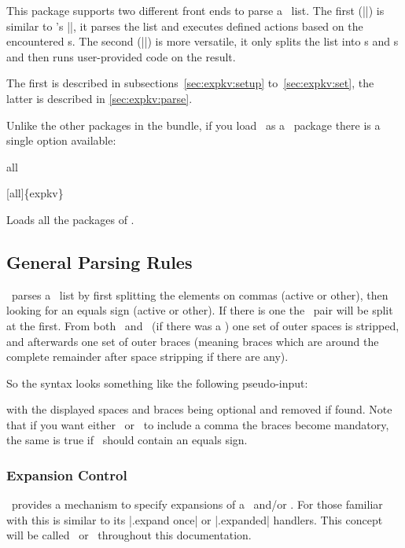 \genericekv\expkv{}

This package supports two different front ends to parse a \kv\ list. The first
(|\ekvset|) is similar to 's |\setkeys|, it parses the list and
executes defined actions based on the encountered \key{}s. The second
(|\ekvparse|) is more versatile, it only splits the list into \key{}s and
\val{}s and then runs user-provided code on the result.

The first is described in subsections~\ref{sec:expkv:setup}
to~\ref{sec:expkv:set}, the latter is described in \autoref{sec:expkv:parse}.

Unlike the other packages in the bundle, if you load \expkv\ as a \LaTeXe\
package there is a single option available:
\begin{function}{all}
  \begin{syntax}
    [all]\{expkv\}
  \end{syntax}
  Loads all the packages of \expkvbundle.
\end{function}

\subsection{General Parsing Rules}

\expkv\ parses a \kv\ list by first splitting the elements on commas (active or
other), then looking for an equals sign (active or other). If there is one the
\kv\ pair will be split at the first. From both \key\ and \val\ (if there was a
\val) one set of outer spaces is stripped, and afterwards one set of outer
braces (meaning braces which are around the complete remainder after space
stripping if there are any).

So the syntax looks something like the following pseudo-input:
\begin{syntaxexample}
\end{syntaxexample}
with the displayed spaces and braces being optional and removed if found. Note
that if you want either \key\ or \val\ to include a comma the braces become
mandatory, the same is true if \key\ should contain an equals sign.

\subsubsection{Expansion Control\label{sec:expkv:expansion}}

\expkv\ provides a mechanism to specify expansions of a \key\ and/or \val. For
those familiar with \pkg{pgfkeys} this is similar to its |.expand once| or
|.expanded| handlers. This concept will be called \expnotation\ or \expansion\
throughout this documentation.

